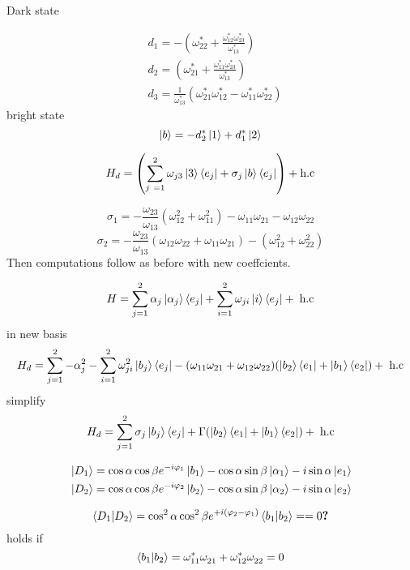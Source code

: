 Dark state

\begin{equation}
\begin{aligned} &
d_1 = -\left(\omega^{*}_{22} + \frac{\omega^{*}_{12}\omega^{*}_{23}}{\omega^{*}_{13}} \right)
\\ &
d_2 = \left(\omega^{*}_{21} + \frac{\omega^{*}_{11}\omega^{*}_{23}}{\omega^{*}_{13}}\right)
\\ &
d_3 = \frac{1}{\omega^{*}_{13}}\left( \omega^{*}_{21}\omega^{*}_{12} - \omega^{*}_{11}\omega^{*}_{22}\right)
\end{aligned}
\end{equation}
bright state 
\begin{equation}
\ket{b} = -d_2^{*}\ket{1} + d_1^{*}\ket{2}
\end{equation}


\begin{equation}
H_d = \left(\sum_{j\ = 1}^{2} \omega_{j3}\ket{3}\bra{e_j} + \sigma_j\ket{b}\bra{e_j} \right) + \text{h.c}
\end{equation}

$$
\sigma_1 = -\frac{\omega_{23}}{\omega_{13}}\left(\omega_{12}^2 + \omega_{11}^2 \right) - \omega_{11}\omega_{21} - \omega_{12}\omega_{22}
$$
$$
\sigma_2 = -\frac{\omega_{23}}{\omega_{13}}\left(\omega_{12}\omega_{22} + \omega_{11}\omega_{21}\right) - \left(\omega_{12}^2 + \omega_{22}^2\right)
$$
Then computations follow as before with new coeffcients.
\newpage

\begin{equation}
H = \sum_{j = 1}^{2}\alpha_j \ket{\alpha_j}\bra{e_j} + \sum_{i = 1}^{2} \omega_{ji} \ket{i}\bra{e_j} + \;\text{h.c}
\end{equation}
in new basis
\begin{equation}
H_d = \sum_{j = 1}^2 -\alpha_j^2 - \sum_{i = 1}^{2}\omega_{ji}^{2}\ket{b_j}\bra{e_j} -(\omega_{11}\omega_{21} + \omega_{12}\omega_{22})(\ket{b_2}\bra{e_1} + \ket{b_1}\bra{e_2}) + \; \text{h.c}
\end{equation}
simplify 
\begin{equation}
H_d = \sum_{j = 1}^2 \sigma_j\ket{b_j}\bra{e_j} + \Gamma (\ket{b_2}\bra{e_1} + \ket{b_1}\bra{e_2}) + \; \text{h.c}
\end{equation}

\begin{equation}
\begin{aligned} &
 \ket{D_1} = \cos\alpha\cos\beta e^{-i\varphi_1}\ket{b_1} - \cos\alpha\sin\beta\ket{\alpha_1} - i\sin\alpha\ket{e_1}
 \\ &
 \ket{D_2} = \cos\alpha\cos\beta e^{-i\varphi_2}\ket{b_2} - \cos\alpha\sin\beta\ket{\alpha_2} - i\sin\alpha\ket{e_2}
 \end{aligned}
\end{equation}

\begin{equation}
\bra{D_1}\ket{D_2} = \cos^2\alpha \cos^2\beta e^{+i(\varphi_2 - \varphi_1)}\bra{b_1}\ket{b_2} == 0 \textbf{?}
\end{equation}
holds if
\begin{equation}
\bra{b_1}\ket{b_2} = \omega_{11}^{*}\omega_{21}^{} + \omega_{12}^{*}\omega_{22}^{} = 0
\end{equation}


